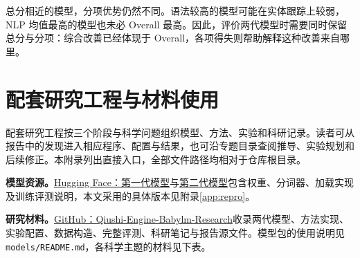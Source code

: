 总分相近的模型，分项优势仍然不同。语法较高的模型可能在实体跟踪上较弱，NLP 均值最高的模型也未必 Overall 最高。因此，评价两代模型时需要同时保留总分与分项：综合改善已经体现于 Overall，各项得失则帮助解释这种改善来自哪里。

\FloatBarrier\clearpage
\section{配套研究工程与材料使用}
\label{app:assets}

配套研究工程按三个阶段与科学问题组织模型、方法、实验和科研记录。读者可从报告中的发现进入相应程序、配置与结果，也可沿专题目录查阅推导、实验规划和后续修正。本附录列出直接入口，全部文件路径均相对于仓库根目录。

\textbf{模型资源。}\href{https://huggingface.co/leslie721007/Qiushi-Engine-Frontier-Advancement}{Hugging Face：第一代模型}与\href{https://huggingface.co/leslie721007/Qiushi-Engine-Principle-Guided-Frontier-Advancement}{第二代模型}包含权重、分词器、加载实现及训练评测说明，本文采用的具体版本见附录\ref{app:repro}。

\textbf{研究材料。}\href{https://github.com/Oxelra-AI/Qiushi-Engine-Babylm-Research}{GitHub：Qiushi-Engine-Babylm-Research}收录两代模型、方法实现、实验配置、数据构造、完整评测、科研笔记与报告源文件。模型包的使用说明见 \nolinkurl{models/README.md}，各科学主题的材料见下表。

